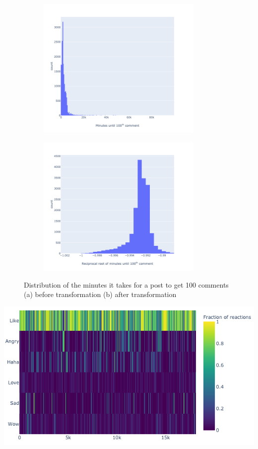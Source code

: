 \documentclass[twoside]{article}
\begin{document}
\begin{figure}[htp]
    \begin{subfigure}{0.5\textwidth}
      \includegraphics[width=8cm]{mins_100_skewed}
      \caption{}
    \end{subfigure}%
    \begin{subfigure}{0.5\textwidth}
      \includegraphics[width=8cm]{mins_100_transformed}
      \caption{}
    \end{subfigure}
  \caption { Distribution of the minutes it takes for a post to get 100 comments (a) before transformation (b) after transformation }\label{fig:a}
\end{figure}
\begingroup
\centering
\includegraphics[scale=0.75]{reaction_fraction_all_posts}
\label{fig:c}
\endgroup
\end{document}
